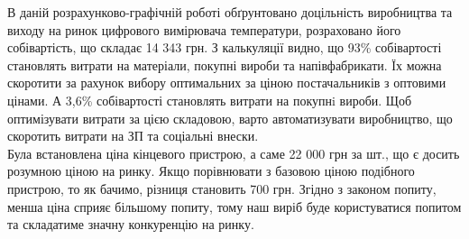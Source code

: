 \documentclass[a4paper,14pt]{extreport}
\begin{document}
\begin{center}
\end{center}
В даній розрахунково-графічній роботі обґрунтовано доцільність
виробництва та виходу на ринок цифрового вимірювача температури, розраховано
його собівартість, що складає 14 343 грн. З калькуляції видно, що 93\%
собівартості становлять витрати на матеріали, покупні вироби та напівфабрикати.
Їх можна скоротити за рахунок вибору оптимальних за ціною постачальників з
оптовими цінами. А 3,6\% собівартості становлять витрати на покупнi вироби. Щоб оптимізувати витрати за цією
складовою, варто автоматизувати виробництво, що скоротить витрати на ЗП та
соціальні внески.\\ 

Була встановлена ціна кінцевого пристрою, а саме 22 000 грн за шт., що є досить розумною
ціною на ринку. Якщо порівнювати з базовою ціною подібного пристрою, то як
бачимо, різниця становить 700 грн. Згідно з законом попиту, менша ціна сприяє
більшому попиту, тому наш виріб буде користуватися попитом та складатиме
значну конкуренцію на ринку.
\end{document}
